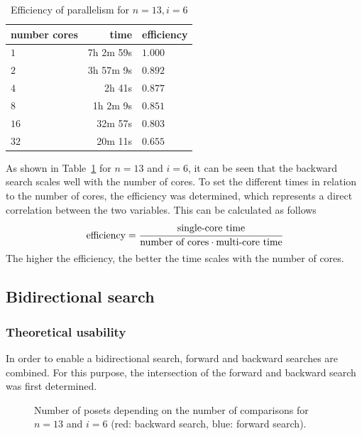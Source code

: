 \documentclass[10pt,journal,compsoc]{IEEEtran}
\begin{document}
\begin{table}[!t]
  \renewcommand{\arraystretch}{1.2}
  \caption{Efficiency of parallelism for $n = 13, i = 6$}
  \label{table:backward-parallel}
  \centering
  \begin{tabular}{l|r|l}
    \textbf{number cores} & \textbf{time} & \textbf{efficiency} \\
    \hline
    $1$                   & 7h 2m 59s     & $1.000$             \\
    $2$                   & 3h 57m 9s     & $0.892$             \\
    $4$                   & 2h 41s        & $0.877$             \\
    $8$                   & 1h 2m 9s      & $0.851$             \\
    $16$                  & 32m 57s       & $0.803$             \\
    $32$                  & 20m 11s       & $0.655$             \\
  \end{tabular}
\end{table}

As shown in Table~\ref{table:backward-parallel} for $n = 13$ and $i = 6$, it can be seen that the backward search scales well with the number of cores.
To set the different times in relation to the number of cores, the efficiency was determined, which represents a direct correlation between the two variables.
This can be calculated as follows
\[
  \text{efficiency} = \cfrac{\text{single-core time}}{\text{number of cores} \cdot \text{multi-core time}}
\]
The higher the efficiency, the better the time scales with the number of cores.


\subsection{Bidirectional search} \label{sec:bidirectional}

\subsubsection{Theoretical usability}

In order to enable a bidirectional search, forward and backward searches are combined.
For this purpose, the intersection of the forward and backward search was first determined.

\begin{figure}[!b]
  \centering
  
  \caption{Number of posets depending on the number of comparisons for $n = 13$ and $i = 6$ (red: backward search, blue: forward search).}
  \label{fig:backward_forward_count_13_6}
\end{figure}
\end{document}
